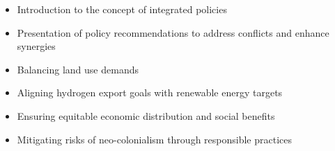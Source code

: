 \begin{itemize}
    \item Introduction to the concept of integrated policies
    \item Presentation of policy recommendations to address conflicts and enhance synergies
    \item Balancing land use demands
    \item Aligning hydrogen export goals with renewable energy targets
    \item Ensuring equitable economic distribution and social benefits
    \item Mitigating risks of neo-colonialism through responsible practices
\end{itemize}